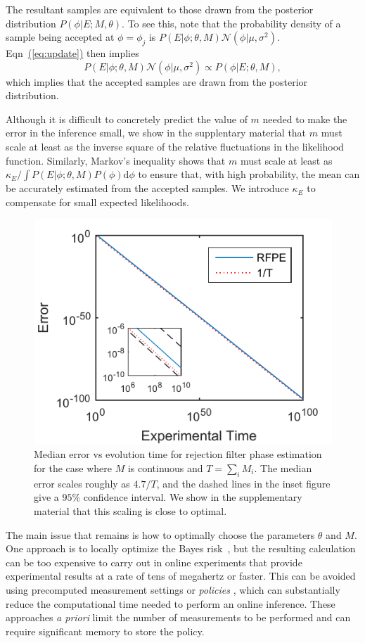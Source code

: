 \documentclass[aps,prl,amsmath,twocolumn,amssymb,superscriptaddress]{revtex4-1}
\newcommand{\eq}[1]{\hyperref[eq:#1]{(\ref*{eq:#1})}}
\newcommand{\app}[1]{the supplentary material}
\begin{document}
The resultant samples are equivalent to those drawn from the posterior distribution
$P(\phi|E;M,\theta)$.  To see this, note that the probability density of a sample being accepted at $\phi=\phi_j$ is $ P(E | \phi; \theta, M) \mathcal{N}(\phi|\mu,\sigma^2)$.  Eqn~\eq{update} then implies 
\begin{equation}
    P(E | \phi; \theta, M) \mathcal{N}(\phi|\mu,\sigma^2) \propto P(\phi | E; \theta, M),
\end{equation}
which implies that the accepted samples are drawn from the posterior distribution.  

Although it is difficult to concretely predict the value of $m$ needed to make the error in the inference small, we show in \app{stability} that $m$ must scale at least as the inverse square of the relative fluctuations in the likelihood function.  Similarly, Markov's inequality shows that $m$ must scale at least as $\kappa_E/\int P(E|\phi;\theta,M)P(\phi) \mathrm{d}\phi$ to ensure that, with high probability, the mean can be accurately estimated from the accepted samples.  We introduce $\kappa_E$ to compensate for small expected likelihoods.

\begin{figure}[t!]
\includegraphics[width=0.8\linewidth]{Longpet2.pdf}
\caption{Median error vs evolution time for rejection filter phase estimation for the case where $M$ is continuous and $T=\sum_i M_i$.  The median error scales roughly as $4.7/T$, and the dashed lines in the inset figure give a $95\%$ confidence interval.  We show in the supplementary material that this scaling is close to optimal.}\label{fig:rms}
\end{figure}

The main issue that remains is how to optimally choose the parameters $\theta$
and $M$. One approach is to locally optimize the Bayes
risk~\cite{granade_robust_2012}, but the resulting calculation can be too
expensive to carry out in online experiments that provide experimental results
at a rate of tens of megahertz or faster.
This can be avoided using precomputed
measurement settings
\cite{sergeevich_characterization_2011}
or \emph{policies} \cite{hentschel_machine_2010,hayes_swarm_2014}, which
can substantially reduce the computational time needed to perform an online inference. These approaches \emph{a priori} limit the number of measurements to
be performed and can require significant memory to store the policy.
\end{document}

